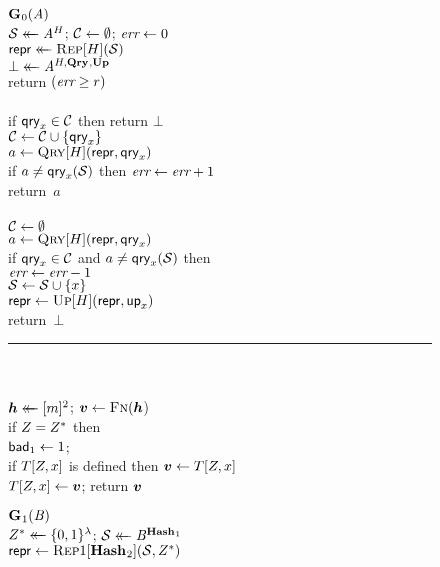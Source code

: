 \begin{figure*}
  {
    \underline{$\game_0(\advA)$}\\[2pt]
      $\col \getsr \advA^H$; $\setC \gets \emptyset$; $\err \gets 0$\\
      $\pub \getsr \Rep[H](\col)$\\
      $\bot \getsr \advA^{H,\QRYO,\UPO}$\\
      return $(\err \geq r)$
    \\[6pt]
    \\[2pt]
      if $\qry_x \in \mathcal{C}$ then return $\bot$\\
      $\setC \gets \setC \union \{\qry_x\}$\\
      $a \gets \Qry[H](\pub, \qry_x)$\\
      if $a \neq \qry_x(\col)$ then $\err \gets \err + 1$\\
      return~$a$
    \\[6pt]
    \\[2pt]
      $\setC \gets \emptyset$\\
      $a \gets \Qry[H](\pub, \qry_x)$\\
      if $\qry_x \in \setC$ and $a \neq \qry_x(\col)$ then\\
      \tab $\err \gets \err-1$\\
      $\col \gets \col \union \{x\}$\\
      $\pub \gets \Up[H](\pub,\up_x)$\\
      return~$\bot$
    \\[4pt]
    \hspace*{-4pt}\rule{1.043\textwidth}{.4pt}
    \\[5pt]
     \hfill{}\hspace*{3pt}\\
      $\hh \getsr [m]^2$; $\vv \gets \fff(\hh$)\\
      if $\salt = \salt^*$ then\\
      \tab $\bad_1 \gets 1$; \\
      if $T[\salt,x]$ is defined then $\vv \gets T[\salt,x]$\\
      $T[\salt,x] \gets \vv$;
      return $\vv$
  }
  {
    \underline{$\game_1(\advB)$}\\[2pt]
      $\salt^* \getsr \bits^\lambda$;
      $\col \getsr \advB^{\HASHO_1}$\\
      $\pub \gets \Repx[\HASHO_2](\col, \salt^*)$\\
}
\end{figure*}
